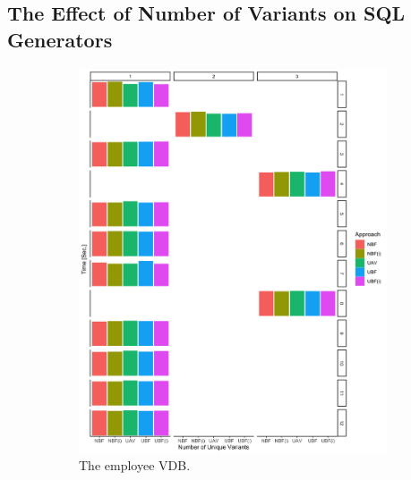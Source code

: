 \subsection{The Effect of Number of Variants on SQL Generators}
\label{sec:exp-vars}


\begin{figure}
\begin{subfigure}{.4\linewidth}
\centering
\includegraphics[width=\textwidth] {figs/plots/emp-comp-var.png}
\caption[The employee VDB]{The employee VDB.}
\label{fig:emp-var-comp}
\end{subfigure}
\begin{subfigure}{.6\linewidth}
\centering

\end{subfigure}
\end{figure}
